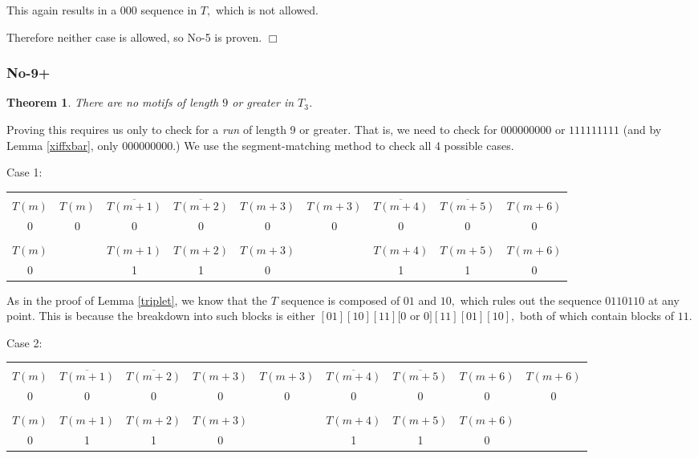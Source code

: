 \documentclass{article}
\newtheorem{theorem}{Theorem}[section]
\begin{document}
This again results in a $000$ sequence in $T,$ which is not allowed.

Therefore neither case is allowed, so No-5 is proven. $\Box$

\subsubsection{No-9+}

\begin{theorem}
\label{no9}
There are no motifs of length $9$ or greater in $T_3$.
\end{theorem}

Proving this requires us only to check for a \emph{run} of length 9 or greater. That is, we need to check for $000000000$ or $111111111$ (and by Lemma \ref{xiffxbar}, only $000000000.$) We use the segment-matching method to check all 4 possible cases.

Case 1:

\begin{center}
\begin{tabular}{ |c|c|c|c|c|c|c|c|c| } 
 \hline
&&&&&&&&\\
$T(m)$ & $T(m)$ & $\overline{T(m+1)}$ & $\overline{T(m+2)}$ & $T(m+3)$ & $T(m+3)$ & $\overline{T(m+4)}$ & $\overline{T(m+5)}$ & $T(m+6)$ \\ 
0 & 0 & 0 & 0 & 0 & 0 & 0 & 0 & 0 \\
\hline
&&&&&&&&\\
$T(m)$ & & $T(m+1)$ & $T(m+2)$ & $T(m+3)$ & & $T(m+4)$ & $T(m+5)$ & $T(m+6)$ \\
0 & & 1 & 1 & 0 & & 1 & 1 & 0 \\
 \hline
\end{tabular}
\end{center}

As in the proof of Lemma \ref{triplet}, we know that the $T$ sequence is composed of $01$ and $10,$ which rules out the sequence $0110110$ at any point. This is because the breakdown into such blocks is either $[01][10][11][0$ or $0][11][01][10],$ both of which contain blocks of $11.$

Case 2:

\begin{center}
\begin{tabular}{ |c|c|c|c|c|c|c|c|c| } 
 \hline
&&&&&&&&\\
$T(m)$ & $\overline{T(m+1)}$ & $\overline{T(m+2)}$ & $T(m+3)$ & $T(m+3)$ & $\overline{T(m+4)}$ & $\overline{T(m+5)}$ & $T(m+6)$ & $T(m+6)$ \\ 
0 & 0 & 0 & 0 & 0 & 0 & 0 & 0 & 0 \\
\hline
&&&&&&&&\\
$T(m)$ & $T(m+1)$ & $T(m+2)$ & $T(m+3)$ & & $T(m+4)$ & $T(m+5)$ & $T(m+6)$ & \\
0 & 1 & 1 & 0 & & 1 & 1 & 0 & \\
 \hline
\end{tabular}
\end{center}
\end{document}
